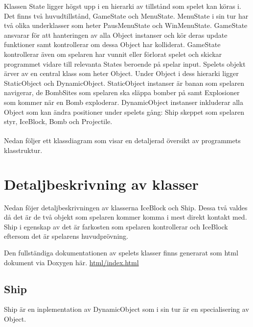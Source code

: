 \documentclass{TDP005mall}
\begin{document}
Klassen State ligger högst upp i en hierarki av tillstånd som spelet kan köras i.
Det finns två huvudtillstånd, GameState och MenuState. MenuState i sin tur har två
olika underklasser som heter PausMenuState och WinMenuState. GameState ansvarar för att
hanteringen av alla Object instanser och kör deras update funktioner samt kontrollerar
om dessa Object har kolliderat. GameState kontrollerar även om spelaren har vunnit
eller förlorat spelet och skickar programmet vidare till relevanta States beroende på
spelar input.
Spelets objekt ärver av en central klass som heter Object. Under Object i dess hierarki
ligger StaticObject och DynamicObject. StaticObject instanser är banan som spelaren
navigerar, de BombSites som spelaren ska släppa bomber på samt Explosioner som kommer när
en Bomb exploderar.
DynamicObject instanser inkluderar alla Object som kan ändra positioner under spelets
gång: Ship skeppet som spelaren styr, IceBlock, Bomb och Projectile.\\
\\
Nedan följer ett klassdiagram som visar en detaljerad översikt av programmets klasstruktur.
\pagebreak

\begin{figure}[h!]
  
  \end{figure}
\pagebreak

\begin{figure}[h!]
  
  \end{figure}
\pagebreak

\section{Detaljbeskrivning av klasser}
Nedan föjer detaljbeskrivningen av klasserna IceBlock och Ship. Dessa två valdes
då det är de två objekt som spelaren kommer komma i mest direkt kontakt med.
Ship i egenskap av det är farkosten som spelaren kontrollerar och IceBlock
eftersom det är spelarens huvudprövning.

Den fullständiga dokumentationen av spelets klasser finns generarat som html dokument via Doxygen
här. \url{html/index.html}

\subsection{Ship}
Ship är en inplementation av DynamicObject som i sin tur är en specialisering av
Object.
\end{document}
